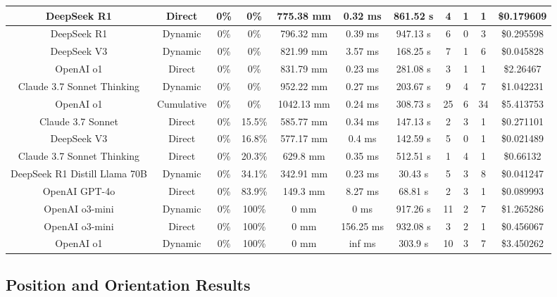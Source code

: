 \begin{landscape}
\begin{table}[H]
\begin{center}
\begin{tabular}{|c|c|c|c|c|c|c|c|c|c|c|}
    \hline
    DeepSeek R1 & Direct & 0\% & 0\% & 775.38 mm & 0.32 ms & 861.52 s & 4 & 1 & 1 & \$0.179609 \\
    \hline
    DeepSeek R1 & Dynamic & 0\% & 0\% & 796.32 mm & 0.39 ms & 947.13 s & 6 & 0 & 3 & \$0.295598 \\
    \hline
    DeepSeek V3 & Dynamic & 0\% & 0\% & 821.99 mm & 3.57 ms & 168.25 s & 7 & 1 & 6 & \$0.045828 \\
    \hline
    OpenAI o1 & Direct & 0\% & 0\% & 831.79 mm & 0.23 ms & 281.08 s & 3 & 1 & 1 & \$2.26467 \\
    \hline
    Claude 3.7 Sonnet Thinking & Dynamic & 0\% & 0\% & 952.22 mm & 0.27 ms & 203.67 s & 9 & 4 & 7 & \$1.042231 \\
    \hline
    OpenAI o1 & Cumulative & 0\% & 0\% & 1042.13 mm & 0.24 ms & 308.73 s & 25 & 6 & 34 & \$5.413753 \\
    \hline
    Claude 3.7 Sonnet & Direct & 0\% & 15.5\% & 585.77 mm & 0.34 ms & 147.13 s & 2 & 3 & 1 & \$0.271101 \\
    \hline
    DeepSeek V3 & Direct & 0\% & 16.8\% & 577.17 mm & 0.4 ms & 142.59 s & 5 & 0 & 1 & \$0.021489 \\
    \hline
    Claude 3.7 Sonnet Thinking & Direct & 0\% & 20.3\% & 629.8 mm & 0.35 ms & 512.51 s & 1 & 4 & 1 & \$0.66132 \\
    \hline
    DeepSeek R1 Distill Llama 70B & Dynamic & 0\% & 34.1\% & 342.91 mm & 0.23 ms & 30.43 s & 5 & 3 & 8 & \$0.041247 \\
    \hline
    OpenAI GPT-4o & Direct & 0\% & 83.9\% & 149.3 mm & 8.27 ms & 68.81 s & 2 & 3 & 1 & \$0.089993 \\
    \hline
    OpenAI o3-mini & Dynamic & 0\% & 100\% & 0 mm & 0 ms & 917.26 s & 11 & 2 & 7 & \$1.265286 \\
    \hline
    OpenAI o3-mini & Direct & 0\% & 100\% & 0 mm & 156.25 ms & 932.08 s & 3 & 2 & 1 & \$0.456067 \\
    \hline
    OpenAI o1 & Dynamic & 0\% & 100\% & 0 mm & inf ms & 303.9 s & 10 & 3 & 7 & \$3.450262 \\
    \hline
\end{tabular}
\label{Results-Position-1-6}
\end{center}
\end{table}

\subsection{Position and Orientation Results}


\end{landscape}
